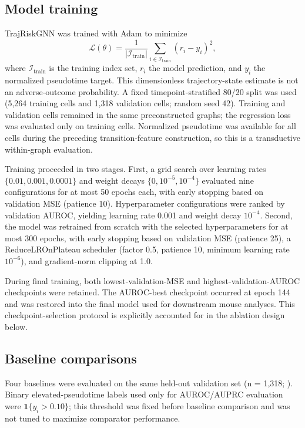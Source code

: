 \subsection*{Model training}

TrajRiskGNN was trained with Adam \cite{ref120} to minimize
\begin{equation}\label{eq:loss}
\mathcal L(\theta)=\frac{1}{|\mathcal I_{\mathrm{train}}|}
\sum_{i\in\mathcal I_{\mathrm{train}}}(r_i-y_i)^2,
\end{equation}
where \(\mathcal I_{\mathrm{train}}\) is the training index set, \(r_i\) the model prediction, and \(y_i\) the normalized pseudotime target. This dimensionless trajectory-state estimate is not an adverse-outcome probability. A fixed timepoint-stratified 80/20 split was used (5,264 training cells and 1,318 validation cells; random seed 42). Training and validation cells remained in the same preconstructed graphs; the regression loss was evaluated only on training cells. Normalized pseudotime was available for all cells during the preceding transition-feature construction, so this is a transductive within-graph evaluation.

Training proceeded in two stages. First, a grid search over learning rates \(\{0.01, 0.001, 0.0001\}\) and weight decays \(\{0, 10^{-5}, 10^{-4}\}\) evaluated nine configurations for at most 50 epochs each, with early stopping based on validation MSE (patience 10). Hyperparameter configurations were ranked by validation AUROC, yielding learning rate 0.001 and weight decay \(10^{-4}\). Second, the model was retrained from scratch with the selected hyperparameters for at most 300 epochs, with early stopping based on validation MSE (patience 25), a ReduceLROnPlateau scheduler (factor 0.5, patience 10, minimum learning rate \(10^{-6}\)), and gradient-norm clipping at 1.0.

During final training, both lowest-validation-MSE and highest-validation-AUROC checkpoints were retained. The AUROC-best checkpoint occurred at epoch 144 and was restored into the final model used for downstream mouse analyses. This checkpoint-selection protocol is explicitly accounted for in the ablation design below.

\subsection*{Baseline comparisons}

Four baselines were evaluated on the same held-out validation set (n = 1,318; ). Binary elevated-pseudotime labels used only for AUROC/AUPRC evaluation were \(\mathbf1\{y_i>0.10\}\); this threshold was fixed before baseline comparison and was not tuned to maximize comparator performance.

